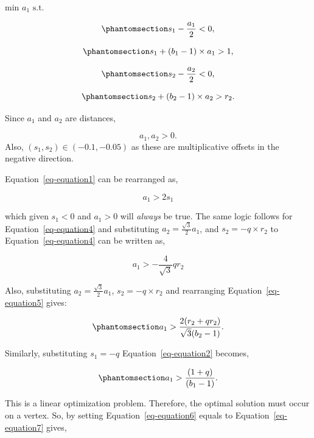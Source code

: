 \documentclass[
  12pt]{article}
\begin{document}
\(\text{min }a_1 \text{ s.t.}\)

\begin{equation}\phantomsection\label{eq-equation1}{
s_1 - \frac{a_1}{2} < 0,
}\end{equation}

\begin{equation}\phantomsection\label{eq-equation2}{
s_1 + (b_1 - 1) \times a_1 > 1,
}\end{equation}

\begin{equation}\phantomsection\label{eq-equation4}{
s_2 - \frac{a_2}{2} < 0,
}\end{equation}

\begin{equation}\phantomsection\label{eq-equation5}{
s_2 + (b_2 - 1) \times a_2 > r_2.
}\end{equation}

Since \(a_1\) and \(a_2\) are distances,

\[
a_1, a_2 > 0.
\] Also, \((s_1, s_2) \in (-0.1, -0.05)\) as these are multiplicative
offsets in the negative direction.

Equation~\ref{eq-equation1} can be rearranged as,

\[
a_1 > 2s_1
\]

which given \(s_1 < 0\) and \(a_1 > 0\) will \emph{always} be true. The
same logic follows for Equation~\ref{eq-equation4} and substituting
\(a_2 = \frac{\sqrt{3}}{2}a_1\), and \(s_2 = -q \times r_2\) to
Equation~\ref{eq-equation4} can be written as,

\[
a_1 > -\frac{4}{\sqrt{3}}qr_2
\]

Also, substituting \(a_2 = \frac{\sqrt{3}}{2}a_1\),
\(s_2 = -q \times r_2\) and rearranging Equation~\ref{eq-equation5}
gives:

\begin{equation}\phantomsection\label{eq-equation6}{
a_1 > \frac{2(r_2 + qr_2)}{\sqrt{3}(b_2 - 1)}.
}\end{equation}

Similarly, substituting \(s_1 = -q\) Equation~\ref{eq-equation2}
becomes,

\begin{equation}\phantomsection\label{eq-equation7}{
a_1 > \frac{(1 + q)}{(b_1 - 1)}.
}\end{equation}

This is a linear optimization problem. Therefore, the optimal solution
must occur on a vertex. So, by setting Equation~\ref{eq-equation6}
equals to Equation~\ref{eq-equation7} gives,
\end{document}
